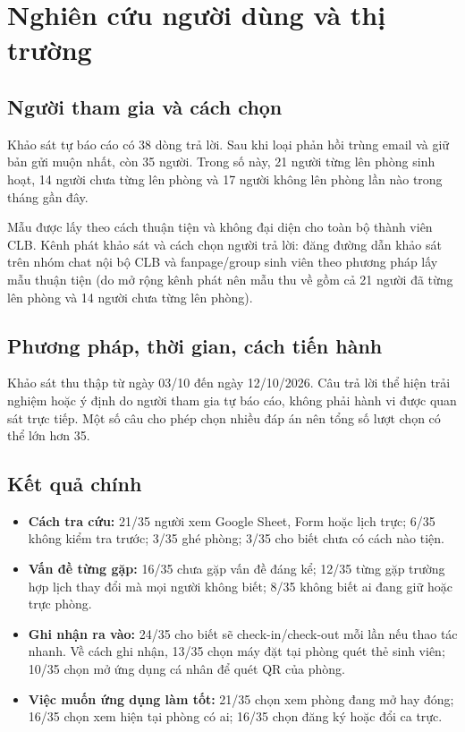 \section{Nghiên cứu người dùng và thị trường}

\subsection{Người tham gia và cách chọn}
Khảo sát tự báo cáo có 38 dòng trả lời. Sau khi loại phản hồi trùng email và giữ bản gửi muộn nhất, còn 35 người. Trong số này, 21 người từng lên phòng sinh hoạt, 14 người chưa từng lên phòng và 17 người không lên phòng lần nào trong tháng gần đây.

Mẫu được lấy theo cách thuận tiện và không đại diện cho toàn bộ thành viên CLB. Kênh phát khảo sát và cách chọn người trả lời: đăng đường dẫn khảo sát trên nhóm chat nội bộ CLB và fanpage/group sinh viên theo phương pháp lấy mẫu thuận tiện (do mở rộng kênh phát nên mẫu thu về gồm cả 21 người đã từng lên phòng và 14 người chưa từng lên phòng).

\subsection{Phương pháp, thời gian, cách tiến hành}
Khảo sát thu thập từ ngày 03/10 đến ngày 12/10/2026. Câu trả lời thể hiện trải nghiệm hoặc ý định do người tham gia tự báo cáo, không phải hành vi được quan sát trực tiếp. Một số câu cho phép chọn nhiều đáp án nên tổng số lượt chọn có thể lớn hơn 35.

\subsection{Kết quả chính}
\begin{itemize}[nosep]
    \item \textbf{Cách tra cứu:} 21/35 người xem Google Sheet, Form hoặc lịch trực; 6/35 không kiểm tra trước; 3/35 ghé phòng; 3/35 cho biết chưa có cách nào tiện.
    \item \textbf{Vấn đề từng gặp:} 16/35 chưa gặp vấn đề đáng kể; 12/35 từng gặp trường hợp lịch thay đổi mà mọi người không biết; 8/35 không biết ai đang giữ hoặc trực phòng.
    \item \textbf{Ghi nhận ra vào:} 24/35 cho biết sẽ check-in/check-out mỗi lần nếu thao tác nhanh. Về cách ghi nhận, 13/35 chọn máy đặt tại phòng quét thẻ sinh viên; 10/35 chọn mở ứng dụng cá nhân để quét QR của phòng.
    \item \textbf{Việc muốn ứng dụng làm tốt:} 21/35 chọn xem phòng đang mở hay đóng; 16/35 chọn xem hiện tại phòng có ai; 16/35 chọn đăng ký hoặc đổi ca trực.
\end{itemize}

